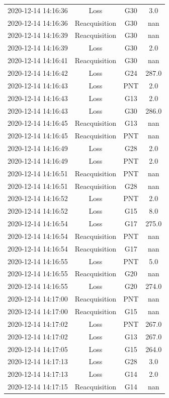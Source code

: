\begin{enumerate}
\begin{longtabu}{cccc}
2020{-}12{-}14 14:16:36&Loss&G30&3.0\\%
2020{-}12{-}14 14:16:36&Reacquisition&G30&nan\\%
2020{-}12{-}14 14:16:39&Reacquisition&G30&nan\\%
2020{-}12{-}14 14:16:39&Loss&G30&2.0\\%
2020{-}12{-}14 14:16:41&Reacquisition&G30&nan\\%
2020{-}12{-}14 14:16:42&Loss&G24&287.0\\%
2020{-}12{-}14 14:16:43&Loss&PNT&2.0\\%
2020{-}12{-}14 14:16:43&Loss&G13&2.0\\%
2020{-}12{-}14 14:16:43&Loss&G30&286.0\\%
2020{-}12{-}14 14:16:45&Reacquisition&G13&nan\\%
2020{-}12{-}14 14:16:45&Reacquisition&PNT&nan\\%
2020{-}12{-}14 14:16:49&Loss&G28&2.0\\%
2020{-}12{-}14 14:16:49&Loss&PNT&2.0\\%
2020{-}12{-}14 14:16:51&Reacquisition&PNT&nan\\%
2020{-}12{-}14 14:16:51&Reacquisition&G28&nan\\%
2020{-}12{-}14 14:16:52&Loss&PNT&2.0\\%
2020{-}12{-}14 14:16:52&Loss&G15&8.0\\%
2020{-}12{-}14 14:16:54&Loss&G17&275.0\\%
2020{-}12{-}14 14:16:54&Reacquisition&PNT&nan\\%
2020{-}12{-}14 14:16:54&Reacquisition&G17&nan\\%
2020{-}12{-}14 14:16:55&Loss&PNT&5.0\\%
2020{-}12{-}14 14:16:55&Reacquisition&G20&nan\\%
2020{-}12{-}14 14:16:55&Loss&G20&274.0\\%
2020{-}12{-}14 14:17:00&Reacquisition&PNT&nan\\%
2020{-}12{-}14 14:17:00&Reacquisition&G15&nan\\%
2020{-}12{-}14 14:17:02&Loss&PNT&267.0\\%
2020{-}12{-}14 14:17:02&Loss&G13&267.0\\%
2020{-}12{-}14 14:17:05&Loss&G15&264.0\\%
2020{-}12{-}14 14:17:13&Loss&G28&3.0\\%
2020{-}12{-}14 14:17:13&Loss&G14&2.0\\%
2020{-}12{-}14 14:17:15&Reacquisition&G14&nan\\%

\end{longtabu}
\end{enumerate}
